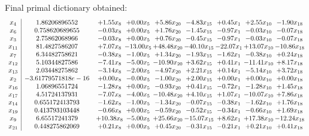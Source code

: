 \documentclass[8pt]{article}
\begin{document}
 Final primal dictionary obtained: 
\[\begin{array}{c| c c@{\hskip 2pt} c@{\hskip 2pt} c@{\hskip 2pt} c@{\hskip 2pt} c@{\hskip 2pt} c@{\hskip 2pt} c@{\hskip 2pt} }
 x_{4}   &  1.86206896552 & +  1.55 x_{8} & +  0.00 x_{5} & +  5.86 x_{20} & -4.83 x_{15} & +  0.45 x_{1} & +  2.55 x_{10} & -1.90 x_{18}\\
 x_{6}   &  0.758620689655 & -0.03 x_{8} & +  0.00 x_{5} & +  1.76 x_{20} & -1.45 x_{15} & -0.97 x_{1} & -0.03 x_{10} & -0.07 x_{18}\\
 x_{3}   &  2.75862068966 & -0.03 x_{8} & +  0.00 x_{5} & +  0.76 x_{20} & -0.45 x_{15} & -0.97 x_{1} & -0.03 x_{10} & -0.07 x_{18}\\
 x_{11}   &  81.4827586207 & +  7.07 x_{8} & -13.00 x_{5} & + 48.48 x_{20} & -40.10 x_{15} & -22.07 x_{1} & + 13.07 x_{10} & -10.86 x_{18}\\
 x_{7}   &  6.34482758621 & -0.38 x_{8} & -1.00 x_{5} & +  1.34 x_{20} & -1.93 x_{15} & -1.62 x_{1} & -0.38 x_{10} & +  0.24 x_{18}\\
 x_{12}   &  5.10344827586 & -7.41 x_{8} & -5.00 x_{5} & -10.90 x_{20} & +  3.62 x_{15} & +  0.41 x_{1} & -11.41 x_{10} & +  8.17 x_{18}\\
 x_{13}   &  2.03448275862 & -3.14 x_{8} & -2.00 x_{5} & -4.97 x_{20} & +  2.21 x_{15} & +  0.14 x_{1} & -5.14 x_{10} & +  3.72 x_{18}\\
 x_{2}   &  -3.61779571818e-16 & +  0.00 x_{8} & -0.00 x_{5} & -1.00 x_{20} & +  2.00 x_{15} & +  0.00 x_{1} & +  0.00 x_{10} & +  0.00 x_{18}\\
 x_{16}   &  1.06896551724 & -1.28 x_{8} & +  0.00 x_{5} & -0.93 x_{20} & +  0.41 x_{15} & -0.72 x_{1} & -1.28 x_{10} & +  1.45 x_{18}\\
 x_{17}   &  4.51724137931 & -7.07 x_{8} & -4.00 x_{5} & -10.48 x_{20} & +  4.10 x_{15} & +  1.07 x_{1} & -10.07 x_{10} & +  7.86 x_{18}\\
 x_{14}   &  0.655172413793 & -1.62 x_{8} & -1.00 x_{5} & -1.34 x_{20} & -0.07 x_{15} & -0.38 x_{1} & -1.62 x_{10} & +  1.76 x_{18}\\
 x_{19}   &  0.413793103448 & -0.66 x_{8} & +  0.00 x_{5} & -0.59 x_{20} & -0.52 x_{15} & -0.34 x_{1} & -0.66 x_{10} & +  1.69 x_{18}\\
 x_{9}   &  6.65517241379 & + 10.38 x_{8} & -5.00 x_{5} & + 25.66 x_{20} & -15.07 x_{15} & +  8.62 x_{1} & + 17.38 x_{10} & -12.24 x_{18}\\
 x_{21}   &  0.448275862069 & +  0.21 x_{8} & +  0.00 x_{5} & +  0.45 x_{20} & -0.31 x_{15} & -0.21 x_{1} & +  0.21 x_{10} & +  0.41 x_{18}\\

\end{array}\]
\end{document}
